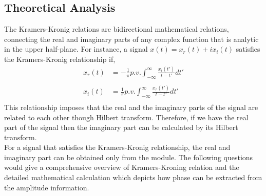\subsection{Theoretical Analysis}
The Kramers-Kronig relations are bidirectional mathematical relations, connecting the real and imaginary parts of any complex function that is analytic in the upper half-plane. For instance, a signal $x(t)=x_r(t) + i x_i(t)$ satisfies the Kramers-Kronig relationship if,
\begin{equation*}
\begin{split}
x_{r}(t) &=-\frac{1}{\pi} p.v. \int_{-\infty}^{\infty} \frac{x_{i}(t')}{t-t'} dt' \\ \\
x_{i}(t) &=\frac{1}{\pi} p.v. \int_{-\infty}^{\infty} \frac{x_{r}(t')}{t-t'} dt' \\
\end{split}
\label{KK}
\end{equation*}
This relationship imposes that the real and the imaginary parts of the signal are related to each other though Hilbert transform. Therefore, if we have the real part of the signal then the imaginary part can be calculated by its Hilbert transform. \\For a signal that satisfies the Kramers-Kronig relationship, the real and imaginary part can be obtained only from the module. The following questions would give a comprehensive overview of Kramers-Kroning relation and the detailed mathematical calculation which depicts how phase can be extracted from the amplitude information.

